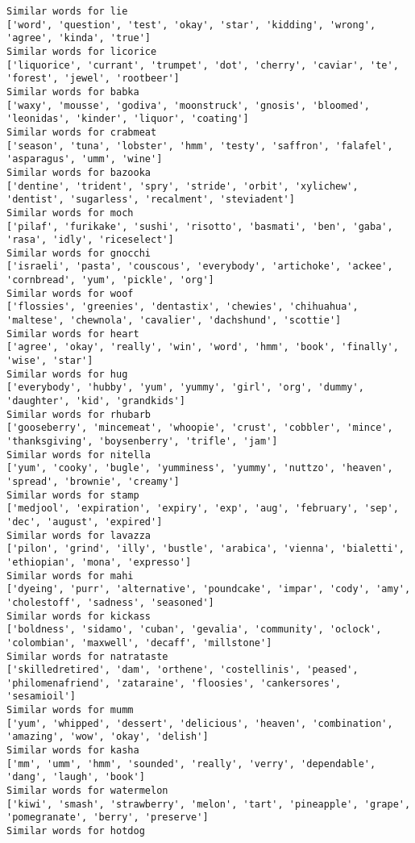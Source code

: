 \documentclass[11pt]{article}
\begin{document}
\begin{Verbatim}[commandchars=\\\{\}]
Similar words for lie
['word', 'question', 'test', 'okay', 'star', 'kidding', 'wrong', 'agree', 'kinda', 'true']
Similar words for licorice
['liquorice', 'currant', 'trumpet', 'dot', 'cherry', 'caviar', 'te', 'forest', 'jewel', 'rootbeer']
Similar words for babka
['waxy', 'mousse', 'godiva', 'moonstruck', 'gnosis', 'bloomed', 'leonidas', 'kinder', 'liquor', 'coating']
Similar words for crabmeat
['season', 'tuna', 'lobster', 'hmm', 'testy', 'saffron', 'falafel', 'asparagus', 'umm', 'wine']
Similar words for bazooka
['dentine', 'trident', 'spry', 'stride', 'orbit', 'xylichew', 'dentist', 'sugarless', 'recalment', 'steviadent']
Similar words for moch
['pilaf', 'furikake', 'sushi', 'risotto', 'basmati', 'ben', 'gaba', 'rasa', 'idly', 'riceselect']
Similar words for gnocchi
['israeli', 'pasta', 'couscous', 'everybody', 'artichoke', 'ackee', 'cornbread', 'yum', 'pickle', 'org']
Similar words for woof
['flossies', 'greenies', 'dentastix', 'chewies', 'chihuahua', 'maltese', 'chewnola', 'cavalier', 'dachshund', 'scottie']
Similar words for heart
['agree', 'okay', 'really', 'win', 'word', 'hmm', 'book', 'finally', 'wise', 'star']
Similar words for hug
['everybody', 'hubby', 'yum', 'yummy', 'girl', 'org', 'dummy', 'daughter', 'kid', 'grandkids']
Similar words for rhubarb
['gooseberry', 'mincemeat', 'whoopie', 'crust', 'cobbler', 'mince', 'thanksgiving', 'boysenberry', 'trifle', 'jam']
Similar words for nitella
['yum', 'cooky', 'bugle', 'yumminess', 'yummy', 'nuttzo', 'heaven', 'spread', 'brownie', 'creamy']
Similar words for stamp
['medjool', 'expiration', 'expiry', 'exp', 'aug', 'february', 'sep', 'dec', 'august', 'expired']
Similar words for lavazza
['pilon', 'grind', 'illy', 'bustle', 'arabica', 'vienna', 'bialetti', 'ethiopian', 'mona', 'expresso']
Similar words for mahi
['dyeing', 'purr', 'alternative', 'poundcake', 'impar', 'cody', 'amy', 'cholestoff', 'sadness', 'seasoned']
Similar words for kickass
['boldness', 'sidamo', 'cuban', 'gevalia', 'community', 'oclock', 'colombian', 'maxwell', 'decaff', 'millstone']
Similar words for natrataste
['skilledretired', 'dam', 'orthene', 'costellinis', 'peased', 'philomenafriend', 'zataraine', 'floosies', 'cankersores', 'sesamioil']
Similar words for mumm
['yum', 'whipped', 'dessert', 'delicious', 'heaven', 'combination', 'amazing', 'wow', 'okay', 'delish']
Similar words for kasha
['mm', 'umm', 'hmm', 'sounded', 'really', 'verry', 'dependable', 'dang', 'laugh', 'book']
Similar words for watermelon
['kiwi', 'smash', 'strawberry', 'melon', 'tart', 'pineapple', 'grape', 'pomegranate', 'berry', 'preserve']
Similar words for hotdog

\end{Verbatim}
\end{document}
